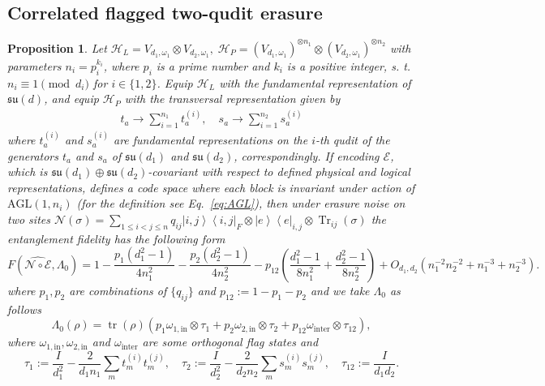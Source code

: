 \documentclass[11pt,letterpaper]{article}
\theoremstyle{plain}
\theoremstyle{plain}
\theoremstyle{plain}
\theoremstyle{plain}
\theoremstyle{plain}
\theoremstyle{plain}
\theoremstyle{plain}
\newtheorem{smproposition}[smtheorem]{Proposition}
\theoremstyle{definition}
\theoremstyle{plain}
\begin{document}
\subsection{Correlated flagged two-qudit erasure}\label{subsec:supple_block_enc_noise}

\begin{smproposition}\label{prop:two_block_fidelity}
    Let
    $
        \mathcal H_L=V_{d_1, \omega_1}\otimes V_{d_2,\omega_1},\;
        \mathcal H_P=(V_{d_1,\omega_1})^{\otimes n_1}\otimes (V_{d_2,\omega_1})^{\otimes n_2}
    $
    with parameters $n_i=p_i^{k_i}$, where $p_i$ is a prime number and $k_i$ is a positive integer, s. t. $n_i\equiv 1 \pmod{d_i}$ for $i\in\{1,2\}$.
    Equip \(\mathcal H_L\) with the fundamental representation of
    \(\mathfrak{su}(d)\), and equip \(\mathcal H_P\) with the transversal
    representation given by
    \begin{equation}
    \begin{gathered}
    t_a \rightarrow \sum_{i=1}^{n_1} t_a^{(i)}, \quad s_a \rightarrow \sum_{i=1}^{n_2} s_a^{(i)}
    \end{gathered}
    \end{equation} 
    where $t_a^{(i)}$ and $s_a^{(i)}$ are fundamental representations on the $i$-th qudit of the generators $t_a$ and $s_a$ of $\mathfrak{su}(d_1)$ and $\mathfrak{su}(d_2)$, correspondingly. 
    If encoding $\mathcal{E}$, which is $\mathfrak{su}(d_1)\oplus\mathfrak{su}(d_2)$-covariant with respect to defined physical and logical representations, defines a code space where each block is invariant under action of $\mathrm{AGL}(1, n_i)$ (for the definition see Eq.~\eqref{eq:AGL}),
then under erasure noise on two sites $\mathcal{N}(\sigma)=\sum_{1 \leq i<j \leq n} q_{i j} \left|i, j\right\rangle\left\langle i, j\right|_F \otimes \left| e\right\rangle\left\langle e\right|_{i, j} \otimes \operatorname{Tr}_{i j}(\sigma)$ the entanglement fidelity has the following form
\[
    F\left(\widehat{\mathcal{N} \circ \mathcal{E}}, \Lambda_0\right)=1-\frac{p_1(d_1^2-1)}{4n_1^2}-\frac{p_2(d_2^2-1)}{4n_2^2}-p_{12}\left(\frac{d_1^2-1}{8n_1^2}+\frac{d_2^2-1}{8n_2^2}\right)+O_{d_1,d_2}\!\left(n_1^{-2}n_2^{-2}+n_1^{-3}+n_2^{-3}\right).
\]
where $p_1, p_2$ are combinations of $\{q_{ij}\}$ and $p_{12}:=1-p_1-p_2$ and we take $\Lambda_0$ as follows
\begin{equation}\label{eq:Lambda0_block}
    \Lambda_0(\rho)=\operatorname{tr}(\rho) \left(p_1\omega_{1, \text{in}} \otimes \tau_1+p_2\omega_{2, \text{in}} \otimes \tau_2+p_{12}\omega_{\text{inter}} \otimes \tau_{12}\right),
\end{equation}
where $\omega_{1, \text{in}}, \omega_{2, \text{in}}$ and $\omega_{\text{inter}}$ are some orthogonal flag states and
\begin{equation}\label{eq:omega_block}
    \tau_1:=\frac{I}{d_1^2}-\frac{2}{d_1 n_1} \sum_m t_m^{(i)} t_m^{(j)}, \quad \tau_2:=\frac{I}{d_2^2}-\frac{2}{d_2 n_2} \sum_m s_m^{(i)} s_m^{(j)}, \quad \tau_{12}:=\frac{I}{d_1 d_2}.
\end{equation}
\end{smproposition}
\end{document}

